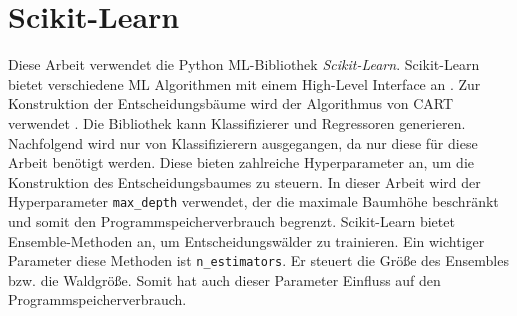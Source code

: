 \section{Scikit-Learn}
\label{sec:dt_scikit_learn}
Diese Arbeit verwendet die Python ML-Bibliothek \textit{Scikit-Learn}. Scikit-Learn bietet verschiedene ML Algorithmen mit einem High-Level Interface an \cite{scikit-learn}.
Zur Konstruktion der Entscheidungsbäume wird der Algorithmus von CART verwendet \cite{ScikitLearnCART}.
Die Bibliothek kann Klassifizierer und Regressoren generieren.
\newline
\newline
Nachfolgend wird nur von Klassifizierern ausgegangen, da nur diese für diese Arbeit benötigt werden. Diese bieten zahlreiche Hyperparameter an, um die Konstruktion des
Entscheidungsbaumes zu steuern. In dieser Arbeit wird der Hyperparameter \texttt{max\_depth} verwendet, der die maximale Baumhöhe beschränkt und somit
den Programmspeicherverbrauch begrenzt.
\newpage
Scikit-Learn bietet Ensemble-Methoden an, um Entscheidungswälder zu trainieren. Ein wichtiger Parameter diese Methoden ist \texttt{n\_estimators}. Er steuert die Größe des Ensembles bzw.
die Waldgröße. Somit hat auch dieser Parameter Einfluss auf den Programmspeicherverbrauch.
